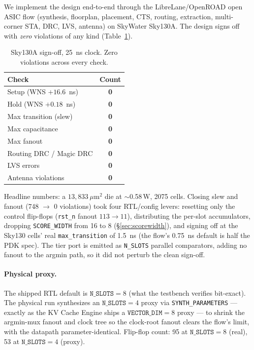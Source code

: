 \documentclass[10pt,twocolumn]{article}
\begin{document}
We implement the design end-to-end through the LibreLane/OpenROAD
\citep{librelane2024} open ASIC flow (synthesis, floorplan, placement, CTS,
routing, extraction, multi-corner STA, DRC, LVS, antenna) on SkyWater Sky130A. The
design signs off with \emph{zero} violations of any kind
(Table~\ref{tab:sky130}).

\begin{table}[tbp]
\centering
\caption{Sky130A sign-off, 25~ns clock. Zero violations across every check.}
\label{tab:sky130}
\small
\begin{tabular}{lc}
\toprule
Check & Count \\
\midrule
Setup (WNS $+16.6$~ns) & \textbf{0} \\
Hold (WNS $+0.18$~ns)  & \textbf{0} \\
Max transition (slew)  & \textbf{0} \\
Max capacitance        & \textbf{0} \\
Max fanout             & \textbf{0} \\
Routing DRC / Magic DRC & \textbf{0} \\
LVS errors             & \textbf{0} \\
Antenna violations     & \textbf{0} \\
\bottomrule
\end{tabular}
\end{table}

Headline numbers: a $13{,}833~\mu$m$^2$ die at $\sim$0.58\,\textmu W, 2075 cells.
Closing slew and fanout (748 $\to$ 0 violations) took four RTL/config levers:
resetting only the control flip-flops (\texttt{rst\_n} fanout $113\to11$),
distributing the per-slot accumulators, dropping \texttt{SCORE\_WIDTH} from 16 to 8
(\S\ref{sec:scorewidth}), and signing off at the Sky130 cells' real
\texttt{max\_transition} of 1.5~ns (the flow's 0.75~ns default is half the PDK
spec). The tier port is emitted as \texttt{N\_SLOTS} parallel comparators, adding
no fanout to the argmin path, so it did not perturb the clean sign-off.

\paragraph{Physical proxy.}
The shipped RTL default is $\texttt{N\_SLOTS}=8$ (what the testbench verifies
bit-exact). The physical run synthesizes an $\texttt{N\_SLOTS}=4$ proxy via
\texttt{SYNTH\_PARAMETERS} --- exactly as the KV Cache Engine ships a
$\texttt{VECTOR\_DIM}=8$ proxy --- to shrink the argmin-mux fanout and clock tree
so the clock-root fanout clears the flow's limit, with the datapath
parameter-identical. Flip-flop count: 95 at $\texttt{N\_SLOTS}{=}8$ (real), 53 at
$\texttt{N\_SLOTS}{=}4$ (proxy).
\end{document}
